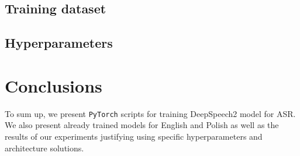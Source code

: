 \documentclass[licencjacka,en]{pracamgr}
\begin{document}
\section{Training dataset}

\section{Hyperparameters}





\chapter{Conclusions}\label{r:concls}

To sum up, we present \texttt{PyTorch} scripts for training DeepSpeech2 model for ASR. We also present already trained models for English and Polish as well as the results of our experiments justifying using specific hyperparameters and architecture solutions.\\
\end{document}

